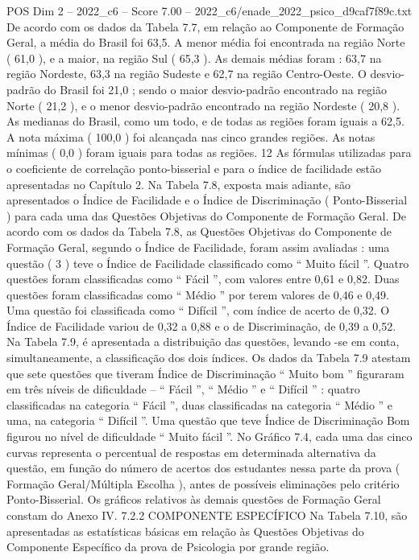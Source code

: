 \begin{textsample}{POS Dim 2 – 2022\_c6 – Score 7.00 – 2022\_c6/enade\_2022\_psico\_d9caf7f89c.txt}
De acordo com os dados da Tabela 7.7, em relação ao Componente de Formação Geral, a média do Brasil foi 63,5.
A menor média foi encontrada na região Norte ( 61,0 ), e a maior, na região Sul ( 65,3 ).
As demais médias foram : 63,7 na região Nordeste, 63,3 na região Sudeste e 62,7 na região Centro-Oeste.
O desvio-padrão do Brasil foi 21,0 ; sendo o maior desvio-padrão encontrado na região Norte ( 21,2 ), e o menor desvio-padrão encontrado na região Nordeste ( 20,8 ).
As medianas do Brasil, como um todo, e de todas as regiões foram iguais a 62,5.
A nota máxima ( 100,0 ) foi alcançada nas cinco grandes regiões.
As notas mínimas ( 0,0 ) foram iguais para todas as regiões. 12 As fórmulas utilizadas para o coeficiente de correlação ponto-bisserial e para o índice de facilidade estão apresentadas no Capítulo 2.
Na Tabela 7.8, exposta mais adiante, são apresentados o Índice de Facilidade e o Índice de Discriminação ( Ponto-Bisserial ) para cada uma das Questões Objetivas do Componente de Formação Geral.
De acordo com os dados da Tabela 7.8, as Questões Objetivas do Componente de Formação Geral, segundo o Índice de Facilidade, foram assim avaliadas : uma questão ( 3 ) teve o Índice de Facilidade classificado como “ Muito fácil ”.
Quatro questões foram classificadas como “ Fácil ”, com valores entre 0,61 e 0,82.
Duas questões foram classificadas como “ Médio ” por terem valores de 0,46 e 0,49.
Uma questão foi classificada como “ Difícil ”, com índice de acerto de 0,32.
O Índice de Facilidade variou de 0,32 a 0,88 e o de Discriminação, de 0,39 a 0,52.
Na Tabela 7.9, é apresentada a distribuição das questões, levando -se em conta, simultaneamente, a classificação dos dois índices.
Os dados da Tabela 7.9 atestam que sete questões que tiveram Índice de Discriminação “ Muito bom ” figuraram em três níveis de dificuldade – “ Fácil ”, “ Médio ” e “ Difícil ” : quatro classificadas na categoria “ Fácil ”, duas classificadas na categoria “ Médio ” e uma, na categoria “ Difícil ”.
Uma questão que teve Índice de Discriminação Bom figurou no nível de dificuldade “ Muito fácil ”.
No Gráfico 7.4, cada uma das cinco curvas representa o percentual de respostas em determinada alternativa da questão, em função do número de acertos dos estudantes nessa parte da prova ( Formação Geral/Múltipla Escolha ), antes de possíveis eliminações pelo critério Ponto-Bisserial.
Os gráficos relativos às demais questões de Formação Geral constam do Anexo IV. 7.2.2 COMPONENTE ESPECÍFICO Na Tabela 7.10, são apresentadas as estatísticas básicas em relação às Questões Objetivas do Componente Específico da prova de Psicologia por grande região.

\end{textsample}
